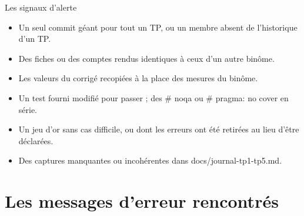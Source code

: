 \documentclass[aspectratio=169,11pt]{beamer}
\newcommand{\co}[1]{{\ttfamily\hyphenchar\font=45\relax #1}}
\begin{document}
\begin{frame}{Les signaux d'alerte}
\begin{itemize}
\item Un seul commit géant pour tout un TP, ou un membre absent de l'historique d'un TP.
\item Des fiches ou des comptes rendus identiques à ceux d'un autre binôme.
\item Les valeurs du corrigé recopiées à la place des mesures du binôme.
\item Un test fourni modifié pour passer ; des \co{\# noqa} ou \co{\# pragma: no cover} en série.
\item Un jeu d'or sans cas difficile, ou dont les erreurs ont été retirées au lieu d'être déclarées.
\item Des captures manquantes ou incohérentes dans \co{docs/journal-tp1-tp5.md}.
\end{itemize}
\end{frame}

\section{Les messages d'erreur rencontrés}
\end{document}
